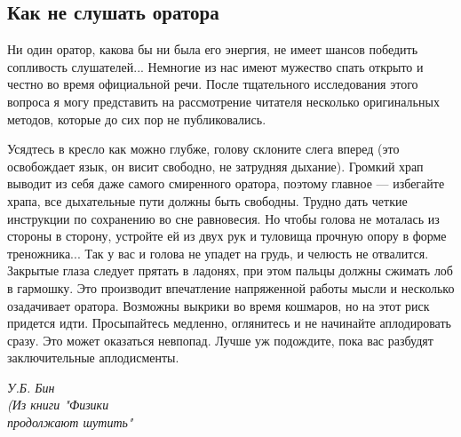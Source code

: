 \begin{multicols}{3}
    \subsection*{Как не слушать оратора}
    \small Ни один оратор, какова бы ни была его энергия, не имеет шансов победить сопливость слушателей... Немногие из нас имеют мужество спать открыто и честно во время официальной речи. После тщательного исследования этого вопроса я могу представить на рассмотрение читателя несколько оригинальных методов, которые до сих пор не публиковались.
    
    Усядтесь в кресло как можно глубже, голову склоните слега вперед (это освобождает язык, он висит свободно, не затрудняя дыхание). Громкий храп выводит из себя даже самого смиренного оратора, поэтому главное --- избегайте храпа, все дыхательные пути должны быть свободны. Трудно дать четкие инструкции по сохранению во сне равновесия. Но чтобы голова не моталась из стороны в сторону, устройте ей из двух рук и туловища прочную опору в форме треножника... Так у вас и голова не упадет на грудь, и челюсть не отвалится. Закрытые глаза следует прятать в ладонях, при этом пальцы должны сжимать лоб в гармошку. Это производит впечатление напряженной работы мысли и несколько озадачивает оратора. Возможны выкрики во время кошмаров, но на этот риск придется идти. Просыпайтесь медленно, оглянитесь и не начинайте аплодировать сразу. Это может оказаться невпопад. Лучше уж подождите, пока вас разбудят заключительные аплодисменты.
    \begin{flushright}
        {\textit{У.Б. Бин\\(Из книги "Физики\\продолжают шутить"}}
    \end{flushright}
\end{multicols}

